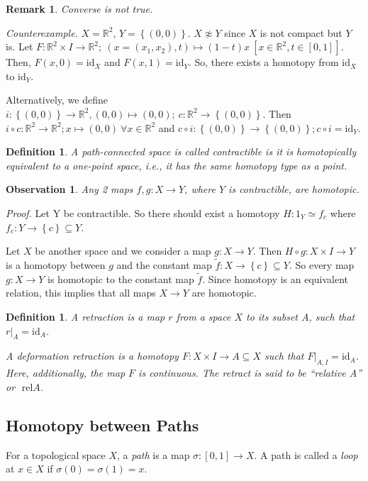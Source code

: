 \documentclass[a4paper,11pt]{article}
\newcommand{\lb}{\left(}
\newcommand{\rb}{\right)}
\newcommand{\lc}{\left\lbrace}
\newcommand{\rc}{\right\rbrace}
\newcommand{\s}{\sigma}
\newcommand{\reals}{\mathbb{R}}
\newcommand{\rel}{\text{ rel}}
\newcommand{\tends}{\rightarrow}
\newcommand{\id}{\text{id}}
\newtheorem{defn}[thm]{Definition}
\newtheorem{obs}[thm]{Observation}
\newtheorem{rem}[thm]{Remark}
\begin{document}
\begin{rem}
Converse is not true.
\end{rem}

\textit{Counterexample.} $X=\reals^2$, $Y=\lc (0,0)\rc$. $X\not\approx  Y$ since $X$ is not compact but $Y$ is. Let $F:\reals^2\times I\rightarrow\reals^2;~\lb x=\lb x_1, x_2\rb, t\rb\mapsto \lb 1-t\rb x~\left[x\in\reals^2, t\in[0,1]\right]$. Then, $F(x, 0)=\id_X$ and $F(x,1)=\id_Y$. So, there exists a homotopy from $\id_X$ to $\id_Y$.

Alternatively, we define $i:\lc (0,0)\rc\tends \reals^2, (0,0)\mapsto (0,0);~c:\reals^2\tends\lc (0,0)\rc.$ Then $i\circ c:\reals^2\tends\reals^2; x\mapsto (0,0)~\forall x\in\reals^2$ and $c\circ i:\lc (0,0)\rc\tends\lc (0,0)\rc; c\circ i=\id_Y$.\Square 

\begin{defn}
A path-connected space is called \emph{contractible} is it is homotopically equivalent to a one-point space, i.e., it has the same homotopy type as a point.
\end{defn}

\begin{obs}
Any 2 maps $f,g:X\tends Y$, where $Y$ is contractible, are homotopic.
\end{obs}

\textit{Proof.} Let Y be contractible. So there should exist a homotopy $H:1_Y\simeq f_c$ where $f_c:Y\tends \lc c\rc\subseteq Y$.

Let $X$ be another space and we consider a map $g:X\tends Y$. Then $H\circ g:X\times I\tends Y$ is a homotopy between $g$ and the constant map $\tilde{f}:X\tends \lc c\rc\subseteq Y$. So every map $g:X\tends Y$ is homotopic to the constant map $\tilde{f}$. Since homotopy is an equivalent relation, this implies that all maps $X\tends Y$ are homotopic.\Square

\begin{defn}
A \emph{retraction} is a map $r$ from a space $X$ to its subset $A$, such that $r|_A=\id_A$.

A deformation retraction is a homotopy $F:X\times I\tends A\subseteq X$ such that $F|_{A,I}=\id_A$. Here, additionally, the map $F$ is continuous. The retract is said to be ``relative $A$'' or $\rel A$.
\end{defn}

\subsection{Homotopy between Paths}
\noindent{}For a topological space $X$, a \emph{path} is a map $\s:[0,1]\tends X$. A path is called a \emph{loop} at $x\in X$ if $\s(0)=\s(1)=x$.
\end{document}
